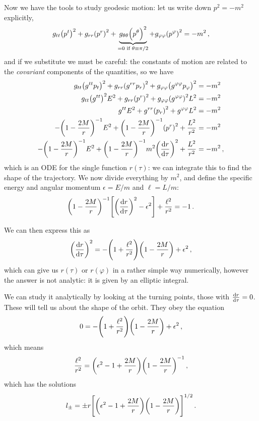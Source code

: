 \documentclass[main.tex]{subfiles}
\begin{document}
Now we have the tools to study geodesic motion: let us write down \(p^2 = -m^2\) explicitly, 
%
\begin{align}
g_{tt} \qty(p^{t})^2 + g_{rr} \qty(p^{r})^2 + \underbrace{g_{\theta \theta } \qty(p^{\theta })^2}_{= 0 \text{ if } \theta \equiv \pi /2} + g_{\varphi \varphi } \qty(p^{\varphi })^2 = - m^2
\,,
\end{align}
%
and if we substitute we must be careful: the constants of motion are related to the \emph{covariant} components of the quantities, so we have 
%
\begin{align}
g_{tt} \qty(g^{tt} p_t)^2 
+ g_{rr} \qty(g^{rr} p_r)^2
+ g_{\varphi \varphi } \qty(g^{\varphi \varphi } p_\varphi )^2
&= - m^2 \\
g_{tt} \qty(g^{tt})^2 E^2 
+ g_{rr} \qty(p^{r})^2
+ g_{\varphi \varphi } \qty(g^{\varphi \varphi })^2 L^2
&= - m^2 \\
 g^{tt} E^2 
+ g^{rr} \qty( p_r)^2
+ g^{\varphi \varphi } L^2
&= - m^2 \\
 -\qty(1 - \frac{2M}{r})^{-1} E^2 
+ \qty(1 - \frac{2M}{r})^{-1} \qty( p^r)^2
+ \frac{L^2}{r^2}
&= - m^2 \\
 -\qty(1 - \frac{2M}{r})^{-1} E^2 
+ \qty(1 - \frac{2M}{r})^{-1} m^2\qty(\dv{r}{\tau })^2
+ \frac{L^2}{r^2}
&= - m^2 
\,,
\end{align}
%
which is an ODE for the single function \(r (\tau )\): we can integrate this to find the shape of the trajectory. 
We now divide everything by \(m^2\), and define the specific energy and angular momentum \(\epsilon = E / m\) and \(\ell = L / m\): 
%
\begin{align}
\qty(1 - \frac{2M}{r})^{-1} \qty[\qty(\dv{r}{\tau })^2 - \epsilon^2]
+ \frac{\ell^2}{r^2} = -1
\,.
\end{align}

We can then express this as 
%
\begin{align}
\qty(\dv{r}{\tau })^2 = - \qty(1 + \frac{\ell^2}{r^2}) \qty(1 - \frac{2M}{r}) + \epsilon^2
\,,
\end{align}
%
which can give us \(r(\tau )\) or \(r(\varphi )\) in a rather simple way numerically, however the answer is not analytic: it is given by an elliptic integral. 

We can study it analytically by looking at the turning points, those with \(\dv{r}{\tau } = 0\).
These will tell us about the shape of the orbit. 
They obey the equation 
%
\begin{align}
0 = - \qty(1 + \frac{\ell^2}{r^2}) \qty(1 - \frac{2M}{r}) + \epsilon^2
\,,
\end{align}
%
which means 
%
\begin{align}
\frac{\ell^2}{r^2} = \qty(\epsilon^2 -1 + \frac{2M}{r}) \qty(1 - \frac{2M}{r})^{-1}
\,,
\end{align}
%
which has the solutions 
%
\begin{align}
l_{\pm} = \pm r \qty[ \qty(\epsilon^2 - 1 + \frac{2M}{r}) \qty(1 - \frac{2M}{r})]^{1/2}
\,.
\end{align}
\end{document}
